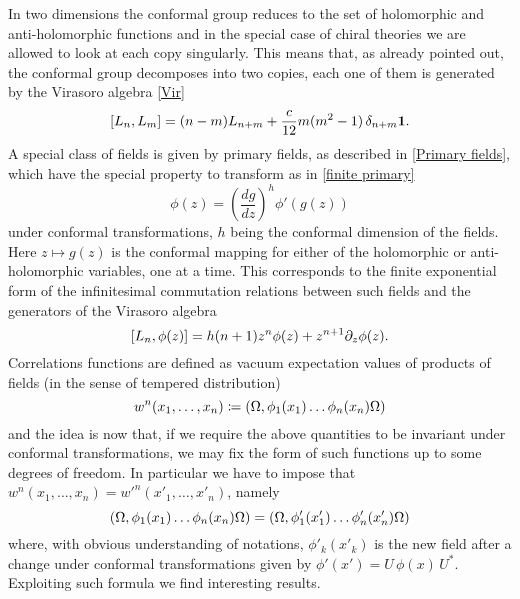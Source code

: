 In two dimensions the conformal group reduces to the set
of holomorphic and anti-holomorphic functions and in
the special case of chiral theories we are allowed
to look at each copy singularly. This means that, as 
already pointed out, the conformal group decomposes
into two copies, each one of them is generated by the
Virasoro algebra \eqref{Vir}
\[
[L_n,L_m]=(n-m)L_{n+m} + \frac{c}{12} m(m^2-1)\,
\delta_{n+m}\bm{1}.
\]
A special class of fields is given by primary fields,
as described in \ref{Primary fields}, which have the special
property to transform as in \eqref{finite primary}
\[
\phi(z)={\left(\frac{dg}{dz}\right)}^h\phi'(g(z))
\]
under conformal transformations, $h$ being the conformal
dimension of the fields. Here $z\mapsto g(z)$ is the 
conformal mapping for either of the holomorphic or
anti-holomorphic variables, one at a time. This corresponds
to the finite exponential form of the infinitesimal 
commutation relations between such fields and the generators
of the Virasoro algebra 
\[
[L_n,\phi(z)]=h(n+1)z^n\phi(z) + z^{n+1}\partial_z \phi(z).
\]
Correlations functions are defined as vacuum expectation values
of products of fields (in the sense of tempered distribution)
\[
 w^n(x_1,\ldots,x_n)\coloneqq
 (\Omega,\phi_1(x_1)\ldots\phi_n(x_n)\Omega)
\]
and the idea is now that, if we require the above quantities to
be invariant under conformal transformations, we may fix
the form of such functions up to some degrees of freedom.
In particular we have to impose that $w^n(x_1,\ldots,x_n)=
w'^n(x'_1,\ldots,x'_n)$, namely
\[
(\Omega,\phi_1(x_1)\ldots\phi_n(x_n)\Omega)=
(\Omega,\phi'_1(x'_1)\ldots\phi'_n(x'_n)\Omega)
\]
where, with obvious understanding of notations,
$\phi'_k(x'_k)$ is the new field after a change under
conformal transformations given by 
$\phi'(x')=U\,\phi(x)\,U^*$.
Exploiting such formula we find interesting results.

